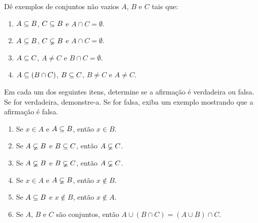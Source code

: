 \documentclass[12pt]{exam}
\begin{document}
    \questao{} D\^e exemplos de conjuntos n\~ao vazios $A$, $B$ e $C$ tais que:
    \begin{enumerate}[label={\alph*})]
        \item $A \subseteq B$, $C \subseteq B$ e $A \cap C = \emptyset$.
        \item $A \subseteq B$, $C \varsubsetneq B$ e $A \cap C = \emptyset$.
        \item $A \subseteq C$, $A \ne C$ e $B \cap C = \emptyset$.
        \item $A \subseteq (B \cap C)$, $B \subseteq C$, $B \ne C$ e $A \ne C$.
    \end{enumerate}

    \vspace{.3cm}

    \questao{} Em cada um dos seguintes itens, determine se a afirma\c{c}\~ao \'e
    verdadeira ou falsa. Se for verdadeira, demonstre-a. Se for falsa, exiba um
    exemplo mostrando que a afirma\c{c}\~ao \'e falsa.
    \begin{enumerate}[label={\alph*})]
    \item Se $x \in A$ e $A \subseteq B$, ent\~ao $x \in B$.

    \item Se $A \varsubsetneq B$ e $B \subseteq C$, ent\~ao $A \varsubsetneq C$.

    \item Se $A \varsubsetneq B$ e $B \varsubsetneq C$, ent\~ao $A \varsubsetneq C$.

    \item Se $x \in A$ e $A \varsubsetneq B$, ent\~ao $x \notin B$.

    \item Se $A \subseteq B$ e $x \notin B$, ent\~ao $x \notin A$.

    \item Se $A$, $B$ e $C$ s\~ao conjuntos, ent\~ao $A \cup (B \cap C) = (A \cup B) \cap C$.
    \end{enumerate}
\end{document}
